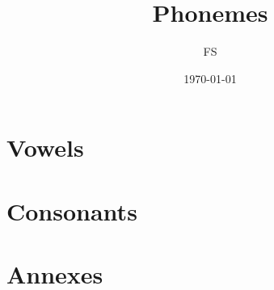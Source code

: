\documentclass[12pt,oneside]{book}
\begin{document}
\title{Phonemes}
\author{FS}
\date{\today}
\maketitle

\frontmatter
\tableofcontents
\mainmatter

\chapter{Vowels}










\chapter{Consonants}









\chapter{Annexes}

\end{document}
